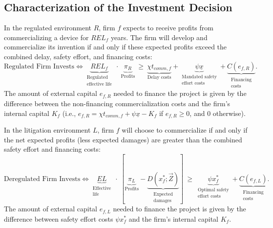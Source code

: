 \documentclass[letterpaper,12pt]{article}
\newcounter{daggerfootnote}
\newcommand*{\daggerfootnote}[1]{%
    \setcounter{daggerfootnote}{\value{footnote}}%
    \renewcommand*{\thefootnote}{\fnsymbol{footnote}}%
    \footnote[2]{#1}%
    \setcounter{footnote}{\value{daggerfootnote}}%
    \renewcommand*{\thefootnote}{\arabic{footnote}}%
    }
\theoremstyle{definition}
\begin{document}
\subsection{Characterization of the Investment Decision}
In the regulated environment $R$, firm $f$ expects to receive profits from commercializing a device for $REL_f$ years. The firm will develop and commercialize its invention if and only if these expected profits exceed the combined delay, safety effort, and financing costs:\footnotemark {}
\begin{equation}\label{eq:firmprofit}
\text{Regulated Firm Invests} \iff  \underbrace{REL_f}_{\substack{\text{Regulated} \\ \text{effective life}}}~  \cdot ~\underbrace{\pi_R}_{\text{Profits}}  ~ \geq  ~  \underbrace{\chi t_{comm,f}}_{\text{Delay costs}}  +  \underbrace{\psi \underline{x}}_{\substack{\text{Mandated safety} \\ \text{effort costs}}}  + \underbrace{C(e_{f,R})}_{\substack{\text{Financing}\\ \text{costs}}}.
\end{equation}
 The amount of external capital $e_{f,R}$ needed to finance the project is given by the difference between the non-financing commercialization costs and the firm's internal capital $K_f$ (i.e., $e_{f,R} = \chi t_{comm,f}    +  \psi \underline{x} - K_f$ if $e_{f,R} \geq 0$, and $0$ otherwise). 


In the litigation environment $L$, firm $f$ will choose to commercialize if and only if the net expected profits (less expected damages) are greater than the combined safety effort and financing costs:\footnotemark {}
\begin{equation}\label{eq:deregfirmprofit}
\text{Deregulated Firm Invests} \iff  \underbrace{EL}_{\substack{\text{Effective} \\ \text{life}}}~ \cdot ~[\underbrace{\pi_L}_{\text{Profits}} - \underbrace{D(x_f^*;\vec{Z})}_{\substack{\text{Expected} \\ \text{damages}}}] ~ \geq  ~   \underbrace{\psi x_f^*}_{\substack{\text{Optimal safety} \\ \text{effort costs}}}  + \underbrace{C(e_{f,L})}_{\substack{\text{Financing}\\ \text{costs}}}.
\end{equation}
The amount of external capital $e_{f,L}$ needed to finance the project is given by the difference between safety effort costs $\psi x_f^*$ and the firm's internal capital $K_f$.
\end{document}
